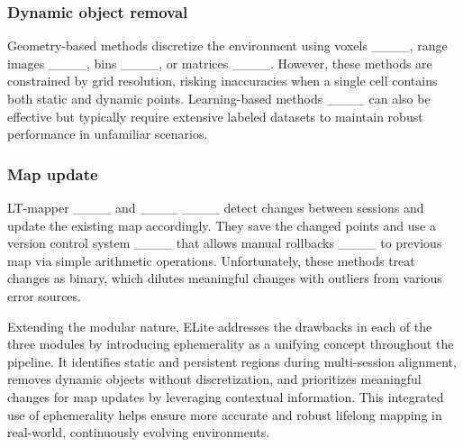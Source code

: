\subsubsection{Dynamic object removal} 
Geometry-based methods discretize the environment using voxels ____, range images ____, bins ____, or matrices ____.
However, these methods are constrained by grid resolution, risking inaccuracies when a single cell contains both static and dynamic points. 
Learning-based methods ____ can also be effective but typically require extensive labeled datasets to maintain robust performance in unfamiliar scenarios.

\subsubsection{Map update} 
LT-mapper ____ and ____ ____ detect changes between sessions and update the existing map accordingly. 
They save the changed points and use a version control system ____ that allows manual rollbacks ____ to previous map via simple arithmetic operations.
Unfortunately, these methods treat changes as binary, which dilutes meaningful changes with outliers from various error sources.

Extending the modular nature, ELite addresses the drawbacks in each of the three modules by introducing ephemerality as a unifying concept throughout the pipeline. It identifies static and persistent regions during multi-session alignment, removes dynamic objects without discretization, and prioritizes meaningful changes for map updates by leveraging contextual information. This integrated use of ephemerality helps ensure more accurate and robust lifelong mapping in real-world, continuously evolving environments.